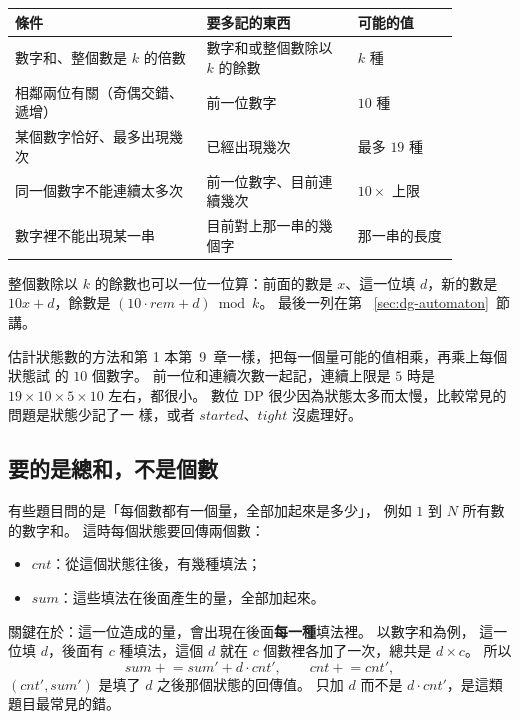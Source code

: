 \begin{center}
\begin{tabular}{p{0.38\linewidth}p{0.3\linewidth}p{0.2\linewidth}}
\toprule
條件 & 要多記的東西 & 可能的值 \\
\midrule
數字和、整個數是 $k$ 的倍數 & 數字和或整個數除以 $k$ 的餘數 & $k$ 種 \\
相鄰兩位有關（奇偶交錯、遞增） & 前一位數字 & $10$ 種 \\
某個數字恰好、最多出現幾次 & 已經出現幾次 & 最多 $19$ 種 \\
同一個數字不能連續太多次 & 前一位數字、目前連續幾次 & $10 \times$ 上限 \\
數字裡不能出現某一串 & 目前對上那一串的幾個字 & 那一串的長度 \\
\bottomrule
\end{tabular}
\end{center}

整個數除以 $k$ 的餘數也可以一位一位算：前面的數是 $x$、這一位填 $d$，新的數是
$10x + d$，餘數是 $(10 \cdot \mathit{rem} + d) \bmod k$。 最後一列在第
~\ref{sec:dg-automaton}~節講。

估計狀態數的方法和第 1 本第~9~章一樣，把每一個量可能的值相乘，再乘上每個狀態試
的 $10$ 個數字。 前一位和連續次數一起記，連續上限是 $5$ 時是
$19 \times 10 \times 5 \times 10$ 左右，都很小。 數位 DP 很少因為狀態太多而太慢，比較常見的問題是狀態少記了一
樣，或者 $\mathit{started}$、$\mathit{tight}$ 沒處理好。

\subsection{要的是總和，不是個數}

有些題目問的是「每個數都有一個量，全部加起來是多少」，
例如 $1$ 到 $N$ 所有數的數字和。 這時每個狀態要回傳兩個數：

\begin{itemize}
\item $\mathit{cnt}$：從這個狀態往後，有幾種填法；
\item $\mathit{sum}$：這些填法在後面產生的量，全部加起來。
\end{itemize}

關鍵在於：這一位造成的量，會出現在後面\textbf{每一種}填法裡。 以數字和為例，
這一位填 $d$，後面有 $c$ 種填法，這個 $d$ 就在 $c$ 個數裡各加了一次，總共是
$d \times c$。 所以
\[
\mathit{sum} \mathrel{+}= \mathit{sum}' + d \cdot \mathit{cnt}', \qquad
\mathit{cnt} \mathrel{+}= \mathit{cnt}',
\]
$(\mathit{cnt}', \mathit{sum}')$ 是填了 $d$ 之後那個狀態的回傳值。 只加 $d$
而不是 $d \cdot \mathit{cnt}'$，是這類題目最常見的錯。

